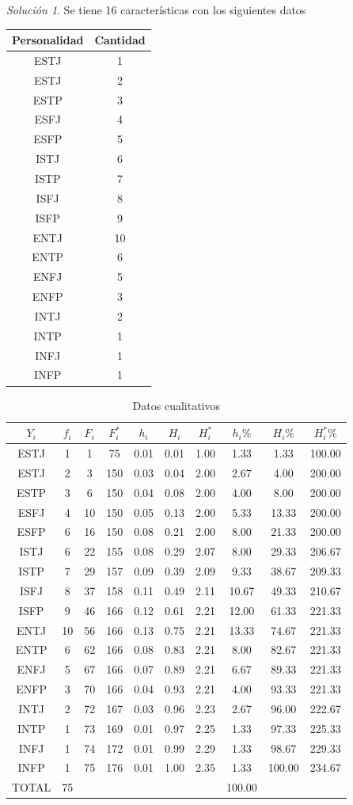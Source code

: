 \documentclass[10pt,]{krantz}
\theoremstyle{definition}
\theoremstyle{definition}
\theoremstyle{definition}
\theoremstyle{definition}
\theoremstyle{remark}
\newtheorem*{solution}{Solución}
\begin{document}
\begin{solution}
{}
Se tiene 16 características con los siguientes datos

\begin{longtable}[]{@{}cc@{}}
\toprule
Personalidad & Cantidad\tabularnewline
\midrule
\endhead
ESTJ & 1\tabularnewline
ESTJ & 2\tabularnewline
ESTP & 3\tabularnewline
ESFJ & 4\tabularnewline
ESFP & 5\tabularnewline
ISTJ & 6\tabularnewline
ISTP & 7\tabularnewline
ISFJ & 8\tabularnewline
ISFP & 9\tabularnewline
ENTJ & 10\tabularnewline
ENTP & 6\tabularnewline
ENFJ & 5\tabularnewline
ENFP & 3\tabularnewline
INTJ & 2\tabularnewline
INTP & 1\tabularnewline
INFJ & 1\tabularnewline
INFP & 1\tabularnewline
\bottomrule
\end{longtable}
\end{solution}

\begin{longtable}[t]{cccccccccc}
\caption{\label{tab:cualitativa}Datos cualitativos}\\
\toprule
$Y_i$ & $f_i$ & $F_i$ & $F_i^*$ & $h_i$ & $H_i$ & $H_i^*$ & $h_i\%$ & $H_i\%$ & $H_i^*\%$\\
\midrule
ESTJ & 1 & 1 & 75 & 0.01 & 0.01 & 1.00 & 1.33 & 1.33 & 100.00\\
ESTJ & 2 & 3 & 150 & 0.03 & 0.04 & 2.00 & 2.67 & 4.00 & 200.00\\
ESTP & 3 & 6 & 150 & 0.04 & 0.08 & 2.00 & 4.00 & 8.00 & 200.00\\
ESFJ & 4 & 10 & 150 & 0.05 & 0.13 & 2.00 & 5.33 & 13.33 & 200.00\\
ESFP & 6 & 16 & 150 & 0.08 & 0.21 & 2.00 & 8.00 & 21.33 & 200.00\\
ISTJ & 6 & 22 & 155 & 0.08 & 0.29 & 2.07 & 8.00 & 29.33 & 206.67\\
ISTP & 7 & 29 & 157 & 0.09 & 0.39 & 2.09 & 9.33 & 38.67 & 209.33\\
ISFJ & 8 & 37 & 158 & 0.11 & 0.49 & 2.11 & 10.67 & 49.33 & 210.67\\
ISFP & 9 & 46 & 166 & 0.12 & 0.61 & 2.21 & 12.00 & 61.33 & 221.33\\
ENTJ & 10 & 56 & 166 & 0.13 & 0.75 & 2.21 & 13.33 & 74.67 & 221.33\\
ENTP & 6 & 62 & 166 & 0.08 & 0.83 & 2.21 & 8.00 & 82.67 & 221.33\\
ENFJ & 5 & 67 & 166 & 0.07 & 0.89 & 2.21 & 6.67 & 89.33 & 221.33\\
ENFP & 3 & 70 & 166 & 0.04 & 0.93 & 2.21 & 4.00 & 93.33 & 221.33\\
INTJ & 2 & 72 & 167 & 0.03 & 0.96 & 2.23 & 2.67 & 96.00 & 222.67\\
INTP & 1 & 73 & 169 & 0.01 & 0.97 & 2.25 & 1.33 & 97.33 & 225.33\\
INFJ & 1 & 74 & 172 & 0.01 & 0.99 & 2.29 & 1.33 & 98.67 & 229.33\\
INFP & 1 & 75 & 176 & 0.01 & 1.00 & 2.35 & 1.33 & 100.00 & 234.67\\
TOTAL & 75 &  &  &  &  &  & 100.00 &  & \\
\bottomrule
\end{longtable}
\end{document}
